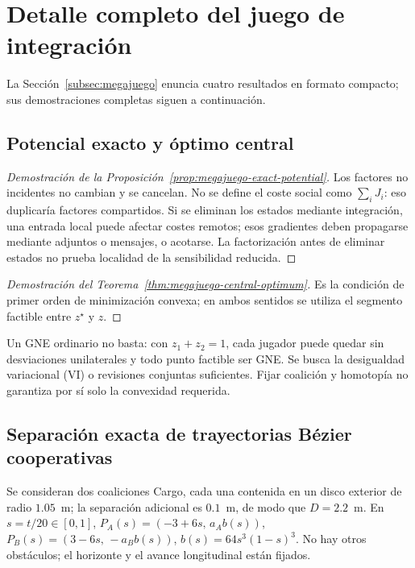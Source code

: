 \section{Detalle completo del juego de integración}
\label{app:megajuego-full-detail}

La Sección~\ref{subsec:megajuego} enuncia cuatro resultados en formato
compacto; sus demostraciones completas siguen a continuación.

\subsection{Potencial exacto y óptimo central}
\label{app:megajuego-potential-proof}

\begin{proof}[Demostración de la Proposición~\ref{prop:megajuego-exact-potential}]
Los factores no incidentes no cambian y se cancelan. No se define el coste
social como $\sum_iJ_i$: eso duplicaría factores compartidos. Si se eliminan
los estados mediante integración, una entrada local puede afectar costes
remotos; esos gradientes deben propagarse mediante adjuntos o mensajes, o
acotarse. La factorización antes de eliminar estados no prueba localidad de
la sensibilidad reducida.
\end{proof}

\begin{proof}[Demostración del Teorema~\ref{thm:megajuego-central-optimum}]
Es la condición de primer orden de minimización convexa; en ambos sentidos se
utiliza el segmento factible entre $z^\star$ y $z$.
\end{proof}

Un GNE ordinario no basta: con $z_1+z_2=1$, cada jugador puede quedar sin
desviaciones unilaterales y todo punto factible ser GNE. Se busca la
desigualdad variacional (VI) o revisiones conjuntas suficientes. Fijar
coalición y homotopía no garantiza por sí solo la convexidad requerida.

\subsection{Separación exacta de trayectorias Bézier cooperativas}
\label{app:megajuego-bezier-proof}

Se consideran dos coaliciones Cargo, cada una contenida en un disco exterior
de radio $1.05$~m; la separación adicional es $0.1$~m, de modo que
$D=2.2$~m. En $s=t/20\in[0,1]$, $P_A(s)=(-3+6s,\,a_Ab(s))$,
$P_B(s)=(3-6s,\,-a_Bb(s))$, $b(s)=64s^3(1-s)^3$. No hay otros obstáculos; el
horizonte y el avance longitudinal están fijados.

